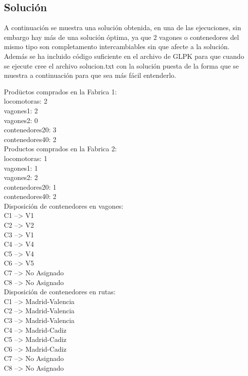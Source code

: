 \documentclass[11pt,spanish]{article}
\begin{document}
		\subsection{Solución}
		A continuación se muestra una solución obtenida, en una de las ejecuciones, sin embargo hay más de una solución óptima, ya que 2 vagones o contenedores del mismo tipo son completamento intercambiables sin que afecte a la solución. Además se ha incluido código suficiente en el archivo de GLPK para que cuando se ejecute cree el archivo solucion.txt con la solución puesta de la forma que se muestra a continuación para que sea más fácil entenderlo.
		\begin{tabbing}
		Prod\=uctos comprados en la Fabrica 1:\\
		\>	locomotoras: 2\\
		\>	vagones1: 2\\
		\>	vagones2: 0\\
		\>	contenedores20: 3\\
		\>	contenedores40: 2\\
		Productos comprados en la Fabrica 2:\\
		\>	locomotoras: 1\\
		\>	vagones1: 1\\
		\>	vagones2: 2\\
		\>	contenedores20: 1\\
		\>	contenedores40: 2\\
		Disposición de contenedores en vagones:\\
		\>	C1 --> V1\\
		\>	C2 --> V2\\
		\>	C3 --> V1\\
		\>	C4 --> V4\\
		\>	C5 --> V4\\
		\>	C6 --> V5\\
		\>	C7 --> No Asignado\\
		\>	C8 --> No Asignado\\
		Disposición de contenedores en rutas:\\
		\>	C1 --> Madrid-Valencia\\
		\>	C2 --> Madrid-Valencia\\
		\>	C3 --> Madrid-Valencia\\
		\>	C4 --> Madrid-Cadiz\\
		\>	C5 --> Madrid-Cadiz\\
		\>	C6 --> Madrid-Cadiz\\
		\>	C7 --> No Asignado\\
		\>	C8 --> No Asignado\\

\end{tabbing}
\end{document}
